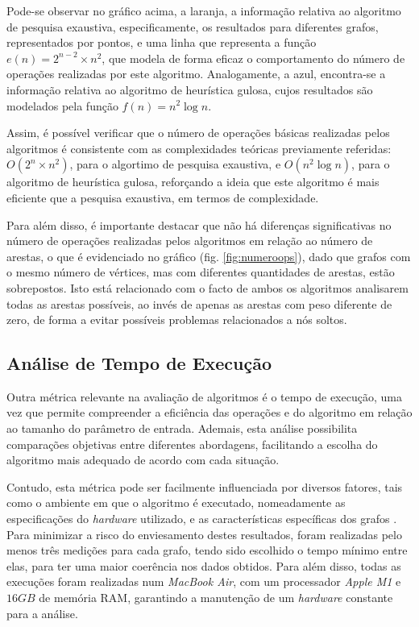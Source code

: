 \documentclass[mirror, portugues]{revdetua}
\begin{document}
Pode-se observar no gráfico acima, a laranja, a informação relativa ao algoritmo de pesquisa exaustiva, especificamente, os resultados para diferentes grafos, representados por pontos, e uma linha que representa a função $e(n) = 2^{n-2} \times n^2$, que modela de forma eficaz o comportamento do número de operações realizadas por este algoritmo. Analogamente, a azul, encontra-se a informação relativa ao algoritmo de heurística gulosa, cujos resultados são modelados pela função $f(n) = n^2 \log n$.

Assim, é possível verificar que o número de operações básicas realizadas pelos algoritmos é consistente com as complexidades teóricas previamente referidas: $O(2^n \times n^2)$, para o algortimo de pesquisa exaustiva, e $O(n^2 \log n)$, para o algoritmo de heurística gulosa, reforçando a ideia que este algoritmo é mais eficiente que a pesquisa exaustiva, em termos de complexidade.

Para além disso, é importante destacar que não há diferenças significativas no número de operações realizadas pelos algoritmos em relação ao número de arestas, o que é evidenciado no gráfico (fig. \ref{fig:numeroops}), dado que grafos com o mesmo número de vértices, mas com diferentes quantidades de arestas, estão sobrepostos. Isto está relacionado com o facto de ambos os algoritmos analisarem todas as arestas possíveis, ao invés de apenas as arestas com peso diferente de zero, de forma a evitar possíveis problemas relacionados a nós soltos.


\subsection{Análise de Tempo de Execução}

Outra métrica relevante na avaliação de algoritmos é o tempo de execução, uma vez que permite compreender a eficiência das operações e do algoritmo em relação ao tamanho do parâmetro de entrada. Ademais, esta análise possibilita comparações objetivas entre diferentes abordagens, facilitando a escolha do algoritmo mais adequado de acordo com cada situação.

Contudo, esta métrica pode ser facilmente influenciada por diversos fatores, tais como o ambiente em que o algoritmo é executado, nomeadamente as especificações do \textit{hardware} utilizado, e as características específicas dos grafos \cite{NP15}. Para minimizar a risco do enviesamento destes resultados, foram realizadas pelo menos três medições para cada grafo, tendo sido escolhido o tempo mínimo entre elas, para ter uma maior coerência nos dados obtidos. Para além disso, todas as execuções foram realizadas num \textit{MacBook Air}, com um processador \textit{Apple M1} e $16GB$ de memória RAM, garantindo a manutenção de um \textit{hardware} constante para a análise.
\end{document}
